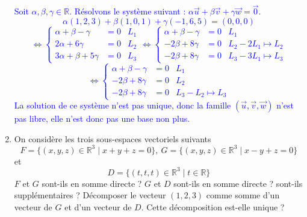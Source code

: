 \documentclass[a4paper,12pt]{article}
\def\R{\mathbb{R}}
\newcommand{\add}[1]{\textcolor{blue}{#1}}
\begin{document}
\begin{exercice}
\begin{enumerate}
              \add{
                  Soit $\alpha, \beta,\gamma \in\R$. Résolvons le système suivant : $\alpha \vec{u} + \beta \vec{v} + \gamma \vec{w} = \vec{0}$.
                  $$
                      \alpha(1,2,3)+\beta(1,0,1)+\gamma(-1,6,5)=(0,0,0)
                  $$
                  $$
                      \iff
                      \left\{
                      \begin{aligned}
                        \alpha + \beta -\gamma &=0 &L_1\\
                        2\alpha + 6\gamma &= 0 &L_2\\
                        3\alpha + \beta + 5\gamma &=0 & L_3
                      \end{aligned}
                      \right.
                      \iff
                      \left\{
                      \begin{aligned}
                        \alpha + \beta -\gamma &=0 &L_1\\
                        -2\beta+ 8\gamma &= 0 &L_2-2L_1\mapsto L_2\\
                        -2\beta + 8\gamma &=0 & L_3-3L_1\mapsto L_3
                      \end{aligned}
                      \right.
                      $$$$
                      \iff
                      \left\{
                      \begin{aligned}
                          \alpha + \beta -\gamma&=0&L_1\\
                          -2\beta+ 8\gamma &= 0&L_2\\
                          -2\beta + 8\gamma &=0&L_3-L_2\mapsto L_3
                      \end{aligned}
                      \right.
                  $$
                  La solution de ce système n'est pas unique, donc la famille $(\vec{u},\vec{v},\vec{w})$ n'est pas libre, elle n'est donc pas une base non plus.
              }
          \item On considère les trois sous-espaces vectoriels suivants
              $$F=\{(x,y,z)\in \R^3 \mid x+y+z = 0\},\: G=\{(x,y,z)\in \R^3 \mid x-y+z=0\}$$
              et
              $$D=\{(t,t,t)\in \R^3 \mid t \in \R\}$$
             $F$ et $G$ sont-ils en somme directe ? $G$ et $D$ sont-ils en somme directe ? sont-ils supplémentaires ?
             Décomposer le vecteur $(1,2,3)$ comme somme d'un vecteur de $G$ et d'un vecteur de $D$. Cette décomposition est-elle unique ? 


\end{enumerate}
\end{exercice}
\end{document}
